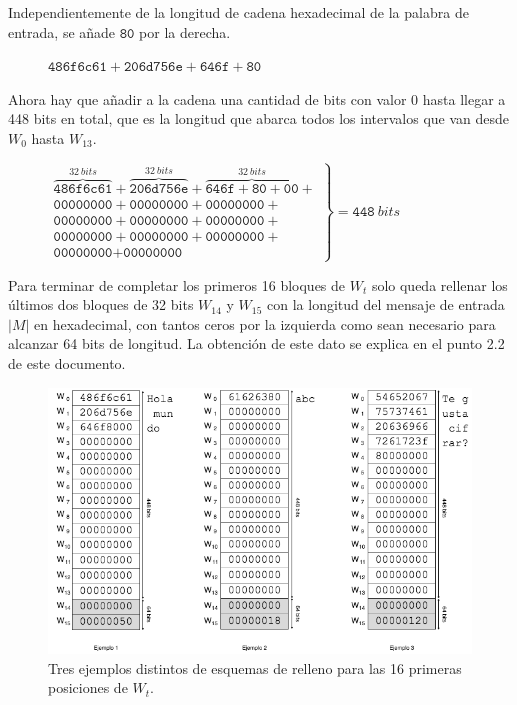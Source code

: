 \documentclass{article}
\begin{document}
        Independientemente de la longitud de cadena hexadecimal de la palabra de entrada, se añade $\texttt{80}$ por la derecha.
            \begin{figure}[H]
            \centering
                $\texttt{486f6c61} + \texttt{206d756e} + \texttt{646f} + \texttt{80}$
            \end{figure}
        
        Ahora hay que añadir a la cadena una cantidad de bits con valor $0$ hasta llegar a 448 bits en total, que es la longitud que abarca todos los intervalos que van desde $W_{0}$ hasta $W_{13}$.
            \begin{figure}[H]
            \centering
                $\left .
                \begin{array}{l}
                    \overbrace{\texttt{486f6c61}}^{32 \ bits}+\overbrace{\texttt{206d756e}}^{32 \ bits}+\overbrace{\texttt{646f} + \texttt{80} + \texttt{00}}^{32 \ bits}+ \\
                    \texttt{00000000}+\texttt{00000000}+\texttt{00000000}+ \\
                    \texttt{00000000}+\texttt{00000000}+\texttt{00000000}+ \\
                    \texttt{00000000}+\texttt{00000000}+\texttt{00000000}+ \\
                    \texttt{00000000}+\texttt{00000000}
                \end{array}
                \right \} = \texttt{448} \ bits$
            \end{figure}

        Para terminar de completar los primeros 16 bloques de $W_{t}$ solo queda rellenar los últimos dos bloques de 32 bits $W_{14}$ y $W_{15}$ con la longitud del mensaje de entrada $|M|$ en hexadecimal, con tantos ceros por la izquierda como sean necesario para alcanzar 64 bits de longitud. La obtención de este dato se explica en el punto 2.2 de este documento.
            \begin{figure}[H]
            \centering
                \includegraphics[scale=0.49]{img/SHA-256-W0-W15}
                \caption{Tres ejemplos distintos de esquemas de relleno para las 16 primeras posiciones de $W_{t}$.}
            \end{figure}
\end{document}
